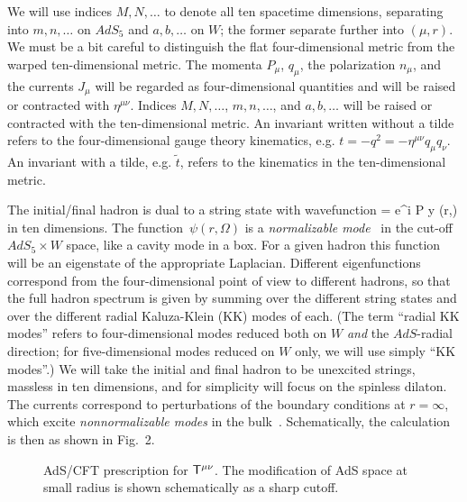 We will use indices $M,N,\ldots$ to denote all ten spacetime dimensions,
separating into $m,n,\ldots$ on $AdS_5$ and $a,b,\ldots$ on $W$; the former
separate further into $(\mu,r)$.   We must be a bit careful to distinguish
the flat four-dimensional metric from the warped ten-dimensional metric.  The
momenta
$P_\mu$, $q_\mu$, the polarization
$n_\mu$, and the currents $J_\mu$ will be regarded as four-dimensional
quantities and will be raised or contracted with $\eta^{\mu\nu}$.  Indices
$M,N,\ldots$, $m,n,\ldots$, and $a,b,\ldots$ will be raised or
contracted with the ten-dimensional metric.  An invariant written
without a tilde refers to the four-dimensional gauge theory kinematics, e.g.
$t = -q^2 = -\eta^{\mu\nu} q_\mu q_\nu$.  An invariant with a tilde, e.g.
$\tilde t$, refers to the kinematics in the ten-dimensional metric.

The initial/final hadron is dual to a
string state with wavefunction
\Phi = e^{i P \cdot y} \psi(r,\Omega)
\ee
in ten dimensions.
The function~$\psi(r,\Omega)$ is a
{\it normalizable mode}~\cite{GKPW} in the cut-off $AdS_5 \times W$ space,
like a cavity mode in a box.  For a
given hadron this function will be an eigenstate of the appropriate
Laplacian.  Different eigenfunctions correspond from the four-dimensional
point of view to different hadrons, so that the full hadron spectrum is given
by summing over the different string states and over the different radial Kaluza-Klein 
(KK) modes of each.  (The term ``radial KK modes'' refers to four-dimensional modes reduced 
both on $W$
{\it and} the $AdS$-radial direction; for five-dimensional modes reduced 
on $W$ only, we will use simply ``KK modes''.)
We will take the initial and final hadron to be
unexcited strings, massless in ten dimensions, and for simplicity will focus
on the spinless dilaton.  The currents correspond to perturbations of the
boundary conditions at
$r = \infty$, which excite {\it nonnormalizable modes} in the
bulk~\cite{GKPW}.  Schematically, the calculation is then as shown in
Fig.~2.
\begin{figure}[t]
\begin{center}
\leavevmode
{}
\end{center}
\caption{AdS/CFT prescription for ${\sf T}^{\mu\nu}$.  The modification of
AdS space at small radius is shown schematically as a sharp cutoff.}
\end{figure}

